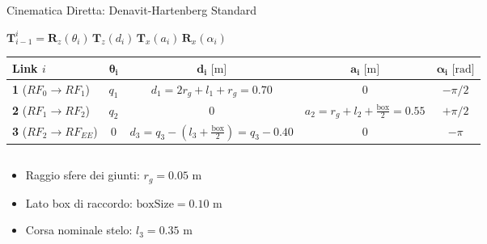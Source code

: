 \documentclass[aspectratio=169, 10pt]{beamer}
\newcommand{\formulaStrip}[1]{%
    \begin{tcolorbox}[
        enhanced, colback=UniPgNavy!6, colframe=UniPgNavy!20,
        boxrule=0.5pt, arc=3pt, boxsep=0pt,
        left=6pt, right=6pt, top=3.5pt, bottom=3.5pt,
        halign=center
    ]
        #1
    \end{tcolorbox}%
}
\begin{document}
\begin{frame}{Cinematica Diretta: Denavit-Hartenberg Standard}
    \vspace{-0.10cm}
    \formulaStrip{\small\color{UniPgNavy}
        $\mathbf{T}_{i-1}^i = \mathbf{R}_z(\theta_i) \, \mathbf{T}_z(d_i) \, \mathbf{T}_x(a_i) \, \mathbf{R}_x(\alpha_i)$
    }

    \vspace{0.10cm}
    \centering
    \renewcommand{\arraystretch}{1.18}
    {\footnotesize
    \begin{tabular}{lcccc}
        \toprule
        \textbf{Link} $i$ & $\boldsymbol{\theta_i}$ & $\mathbf{d_i}\text{ [m]}$ & $\mathbf{a_i}\text{ [m]}$ & $\boldsymbol{\alpha_i}\text{ [rad]}$ \\
        \midrule
        \textbf{1} ($RF_0 \to RF_1$) & $q_1$ & $d_1 = 2r_g + l_1 + r_g = 0.70$ & $0$ & $-\pi/2$ \\
        \textbf{2} ($RF_1 \to RF_2$) & $q_2$ & $0$ & $a_2 = r_g + l_2 + \tfrac{\text{box}}{2} = 0.55$ & $+\pi/2$ \\
        \textbf{3} ($RF_2 \to RF_{EE}$) & $0$ & $d_3 = q_3 - (l_3 + \tfrac{\text{box}}{2}) = q_3 - 0.40$ & $0$ & $-\pi$ \\
        \bottomrule
    \end{tabular}
    }

    \vspace{0.18cm}
    \begin{columns}[onlytextwidth, T]
        \begin{column}{0.485\textwidth}
            \begin{tcolorbox}[moderncard, title={\color{UniPgNavy}Parametri Geometrici di Offset}, equal height group=dh_bot]
                \footnotesize
                \begin{itemize}
                    \setlength{\itemsep}{1.5pt}
                    \item Raggio sfere dei giunti: $r_g = 0.05\text{ m}$
                    \item Lato box di raccordo: $\text{boxSize} = 0.10\text{ m}$
                    \item Corsa nominale stelo: $l_3 = 0.35\text{ m}$
                \end{itemize}
            \end{tcolorbox}
        \end{column}


\end{columns}
\end{frame}
\end{document}
